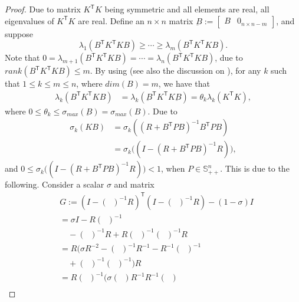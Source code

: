 \documentclass[letterpaper, 10 pt, conference]{ieeeconf}  %
\newcommand{\transpose}{\mathsf{T}}
\DeclareMathOperator{\tempRBP}{R + B^{\transpose}PB}
\begin{document}
\begin{proof}
    Due to matrix $K^{\transpose}K$ being symmetric and all elements are real, all eigenvalues of $K^{\transpose}K$ are real.
    Define an $n\times n$ matrix
        $\underbar{B} := 
        \begin{bmatrix}
            B & 0_{n\times n-m}
        \end{bmatrix}$,
    and suppose
    \begin{equation*}
        \lambda_{1}(B^{\transpose}K^{\transpose}KB) \geq \cdots \geq \lambda_{m}(B^{\transpose}K^{\transpose}KB).
    \end{equation*}
    Note that $       0 =  \lambda_{m+1}(B^{\transpose}K^{\transpose}KB) = \cdots = \lambda_{n}(B^{\transpose}K^{\transpose}KB)$,
    due to $\textit{rank}(B^{\transpose}K^{\transpose}KB) \leq m$.
    By using \cite[Theorem 4.5.9]{horn_matrix_2013} (see also the discussion on \cite[p.~284]{horn_matrix_2013}), for any $k$ such that $1\leq k\leq m\leq n$,  where $\textit{dim}(B)=m$,
    we have that
    \begin{align*}
        \lambda_{k}(B^{\transpose}K^{\transpose}KB) &= \lambda_{k}(\underbar{B}^{\transpose}K^{\transpose}K\underbar{B})= \theta_{k}\lambda_{k}(K^{\transpose}K),
    \end{align*}
    where $0\leq \theta_{k} \leq \sigma_{max}(\underbar{B})=\sigma_{max}(B)$.
    Due to
    \begin{align*}
        \sigma_{k}(KB) &= \sigma_{k}((R+B^{\transpose}PB)^{-1}B^{\transpose}PB)\\
        &= \sigma_{k}\bigg((I - (R+B^{\transpose}PB)^{-1}R) \bigg),
    \end{align*}
    and
       $0 \leq \sigma_{k}\bigg((I - (R+B^{\transpose}PB)^{-1}R) \bigg) < 1$,
    when $P \in \mathbb{S}_{++}^{n}$. This is due to the following. Consider a scalar $\sigma$ and matrix
    \begin{align*}
        &G := (I-(\tempRBP)^{-1}R)^{\transpose}(I-(\tempRBP)^{-1}R) - (1-\sigma) I \\
        &= \sigma I - R(\tempRBP)^{-1} \\
        &\quad - (\tempRBP)^{-1}R + R(\tempRBP)^{-1}(\tempRBP)^{-1}R\\
        &= R\bigg(\sigma R^{-2}- (\tempRBP)^{-1}R^{-1} - R^{-1}(\tempRBP)^{-1}\\
        &\quad + (\tempRBP)^{-1}(\tempRBP)^{-1} \bigg)R\\
        &= R(\tempRBP)^{-1}\bigg(\sigma(\tempRBP)R^{-1}R^{-1}(\tempRBP) \\

\end{align*}
\end{proof}
\end{document}
